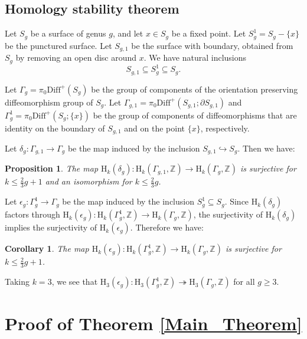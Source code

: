 \documentclass[12pt]{amsart}
\newtheorem{proposition}{Proposition}
\newtheorem{corollary}{Corollary}
\begin{document}
\subsection{Homology stability theorem} 
Let $S_{g}$ be a surface of genus $g$, and let $x\in S_g$ be a fixed point. Let $S_g^1=S_g-\{x\}$ be the punctured surface. Let $S_{g,1}$ be the surface with boundary, obtained from $S_g$ by removing an open disc around $x$. We have natural inclusions 
$$S_{g,1}\subseteq S_g^1\subseteq S_g.$$

Let $\Gamma_g=\pi_0\mathrm{Diff}^+(S_g)$ be the group of components of the orientation preserving diffeomorphism group of $S_g$. Let $\Gamma_{g,1}=\pi_0\mathrm{Diff}^+(S_{g,1};\partial S_{g,1})$ and $\Gamma_{g}^1=\pi_0\mathrm{Diff}^+(S_g;\{x\})$ be the group of components of diffeomorphisms that are identity on the boundary of $S_{g,1}$ and on the point $\{x\}$, respectively. 

Let $\delta_g\colon\Gamma_{g,1}\to\Gamma_{g}$ be the map induced by the inclusion $S_{g,1}\hookrightarrow S_g$. Then we have:
\begin{proposition}{\cite[Theorem 1.2]{zbMATH06492666}}
The map $\mathrm{H}_k(\delta_g)\colon\mathrm{H}_k(\Gamma_{g,1},\mathbb{Z})\to\mathrm{H}_k(\Gamma_{g},\mathbb{Z})$ is surjective for $k\leq \frac{2}{3}g+1$ and an isomorphism for $k\leq\frac{2}{3}g$.
\end{proposition}
Let $\epsilon_g\colon\Gamma_g^1\to\Gamma_g$ be the map induced by the inclusion $S_g^1\subseteq S_g$.  Since $\mathrm{H}_k(\delta_g)$ factors through $\mathrm{H}_k(\epsilon_g)\colon \mathrm{H}_k(\Gamma_{g}^1,\mathbb{Z})\to\mathrm{H}_k(\Gamma_g,\mathbb{Z})$, the surjectivity of $\mathrm{H}_k(\delta_g)$ implies the surjectivity of $\mathrm{H}_k(\epsilon_g)$. Therefore we have:
\begin{corollary}\label{Wahl-corollary}
The map $\mathrm{H}_k(\epsilon_g)\colon \mathrm{H}_k(\Gamma_g^1,\mathbb{Z})\to\mathrm{H}_k(\Gamma_{g},\mathbb{Z})$ is surjective for $k\leq\frac{2}{3}g+1$.
\end{corollary}
Taking \(k=3\), we see that
$
\mathrm{H}_3(\epsilon_g)\colon
\mathrm{H}_3(\Gamma_g^1,\mathbb Z)
\twoheadrightarrow
\mathrm{H}_3(\Gamma_g,\mathbb Z)
$ for all $g\geq3$.




\section{Proof of Theorem \ref{Main_Theorem}}
\end{document}
